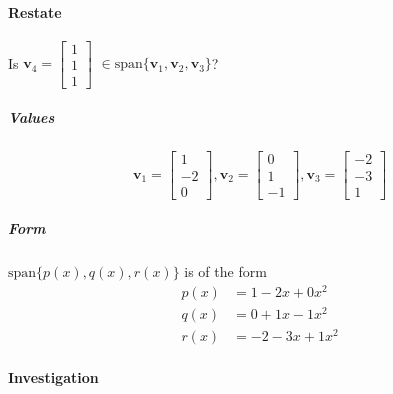 \documentclass{article}
\begin{document}
        \paragraph{Restate}
            Is $\mathbf{v}_4=\begin{bmatrix}1\\1\\1\end{bmatrix}$
            $\in \text{span}\{\mathbf{v}_1, \mathbf{v}_2, \mathbf{v}_3\}$?
            \subparagraph{Values}
                \[
                    \mathbf{v}_1=\begin{bmatrix} 1\\-2\\ 0\end{bmatrix},
                    \mathbf{v}_2=\begin{bmatrix} 0\\ 1\\-1\end{bmatrix},
                    \mathbf{v}_3=\begin{bmatrix}-2\\ -3\\1\end{bmatrix}
                \]
            \subparagraph{Form}
                $\text{span}\{p(x),q(x),r(x)\}$
                is of the form
                \begin{align*}
                    p(x) &= 1 - 2x + 0x^2\\
                    q(x) &= 0 + 1x - 1x^2\\
                    r(x) &= -2 - 3x + 1x^2
                \end{align*}
        \paragraph{Investigation}
\end{document}
